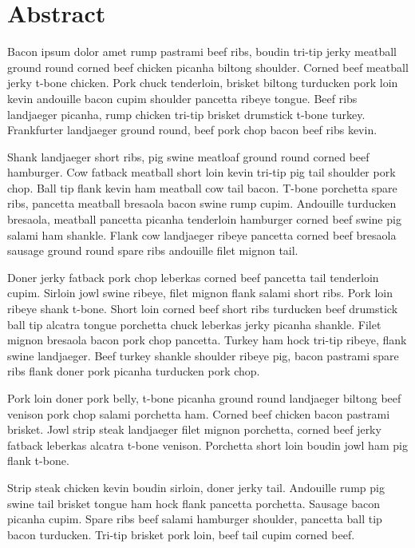 \chapter{Abstract}

\setcounter{page}{1}

Bacon ipsum dolor amet rump pastrami beef ribs, boudin tri-tip jerky meatball ground round corned beef chicken picanha biltong shoulder. Corned beef meatball jerky t-bone chicken. Pork chuck tenderloin, brisket biltong turducken pork loin kevin andouille bacon cupim shoulder pancetta ribeye tongue. Beef ribs landjaeger picanha, rump chicken tri-tip brisket drumstick t-bone turkey. Frankfurter landjaeger ground round, beef pork chop bacon beef ribs kevin.

Shank landjaeger short ribs, pig swine meatloaf ground round corned beef hamburger. Cow fatback meatball short loin kevin tri-tip pig tail shoulder pork chop. Ball tip flank kevin ham meatball cow tail bacon. T-bone porchetta spare ribs, pancetta meatball bresaola bacon swine rump cupim. Andouille turducken bresaola, meatball pancetta picanha tenderloin hamburger corned beef swine pig salami ham shankle. Flank cow landjaeger ribeye pancetta corned beef bresaola sausage ground round spare ribs andouille filet mignon tail.

Doner jerky fatback pork chop leberkas corned beef pancetta tail tenderloin cupim. Sirloin jowl swine ribeye, filet mignon flank salami short ribs. Pork loin ribeye shank t-bone. Short loin corned beef short ribs turducken beef drumstick ball tip alcatra tongue porchetta chuck leberkas jerky picanha shankle. Filet mignon bresaola bacon pork chop pancetta. Turkey ham hock tri-tip ribeye, flank swine landjaeger. Beef turkey shankle shoulder ribeye pig, bacon pastrami spare ribs flank doner pork picanha turducken pork chop.

Pork loin doner pork belly, t-bone picanha ground round landjaeger biltong beef venison pork chop salami porchetta ham. Corned beef chicken bacon pastrami brisket. Jowl strip steak landjaeger filet mignon porchetta, corned beef jerky fatback leberkas alcatra t-bone venison. Porchetta short loin boudin jowl ham pig flank t-bone.

Strip steak chicken kevin boudin sirloin, doner jerky tail. Andouille rump pig swine tail brisket tongue ham hock flank pancetta porchetta. Sausage bacon picanha cupim. Spare ribs beef salami hamburger shoulder, pancetta ball tip bacon turducken. Tri-tip brisket pork loin, beef tail cupim corned beef.
